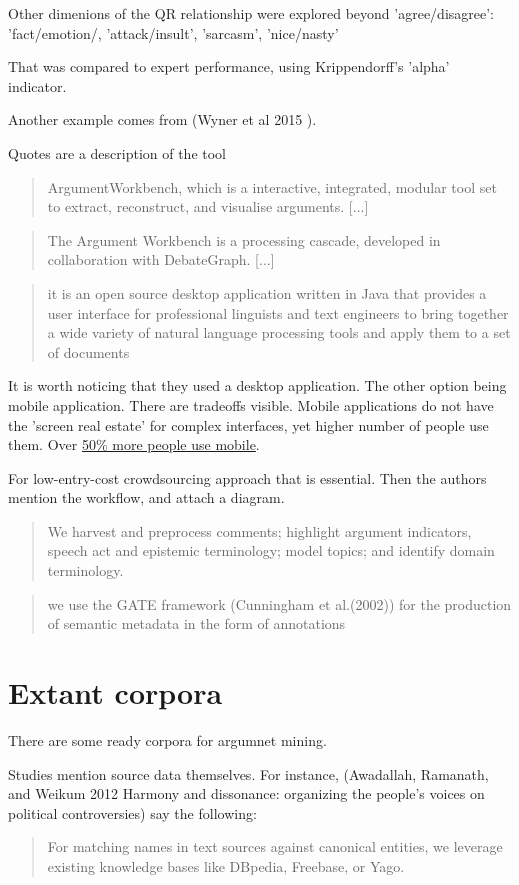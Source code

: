\documentclass{report}
\begin{document}
Other dimenions of the QR relationship were explored beyond 'agree/disagree': 'fact/emotion/, 'attack/insult', 'sarcasm', 'nice/nasty'

That was compared to expert performance, using Krippendorff's 'alpha' indicator.

Another example comes from (Wyner et al 2015 ).

Quotes are a description of the tool
\begin{quote}
 ArgumentWorkbench, which is a interactive, integrated, modular tool set to extract, reconstruct, and visualise arguments. [...]
\end{quote}
\begin{quote}
 The Argument Workbench is a processing cascade, developed in collaboration with DebateGraph. [...]
\end{quote}
\begin{quote}
 it is an open source desktop application written in Java that provides a user interface for professional linguists and text engineers to bring together a wide variety of natural language processing tools and apply them to a set of documents
\end{quote}

It is worth noticing that they used a desktop application. The other option being mobile application. There are tradeoffs visible.
Mobile applications do not have the 'screen real estate' for complex interfaces, yet higher number of people use them. Over \href{https://gs.statcounter.com/platform-market-share/desktop-mobile-tablet}{50\% more people use mobile}.

For low-entry-cost crowdsourcing approach that is essential.
Then the authors mention the workflow, and attach a diagram.
\begin{quote}
 We harvest and preprocess comments; highlight argument indicators, speech act and epistemic terminology; model topics; and identify domain terminology.
\end{quote}
\begin{quote}
 we use the GATE framework (Cunningham et al.(2002)) for the production of semantic metadata in the form of annotations
\end{quote}

\section{Extant corpora}
There are some ready corpora for argumnet mining.

Studies mention source data themselves. 
For instance, (Awadallah, Ramanath, and Weikum 2012 Harmony and dissonance: organizing the people's voices on political controversies)
say the following:
\begin{quote}
 For matching names in text sources against canonical entities, we leverage existing knowledge bases like DBpedia, Freebase, or Yago.
\end{quote}
\end{document}

